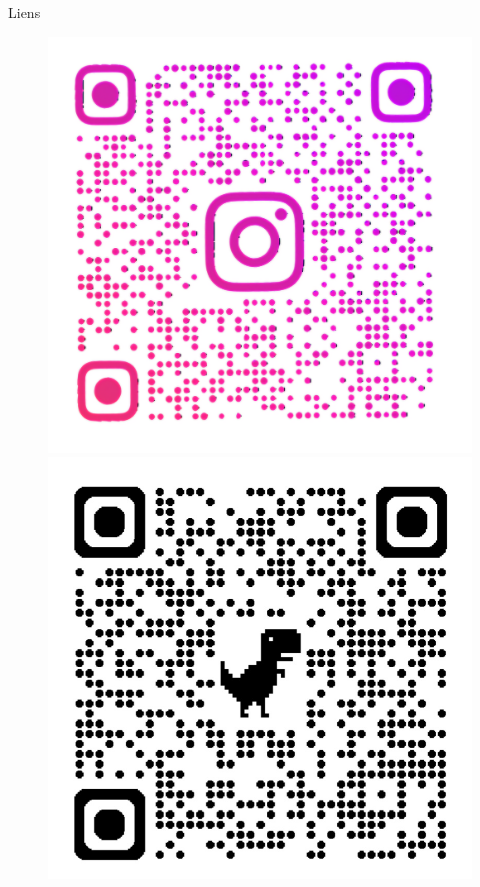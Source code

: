 \documentclass[xcolor=dvipsnames]{beamer}
\begin{document}
	\begin{frame}{Liens}
		\begin{figure}
			\centering
			\begin{minipage}{.5\textwidth}
				\centering
				\includegraphics[width=1\linewidth]{Insta.png}
			\end{minipage}%
			\begin{minipage}{.5\textwidth}
				\centering
				\includegraphics[width=1\linewidth]{Github.jpg}
			\end{minipage}
		\end{figure}
	\end{frame}
\end{document}
